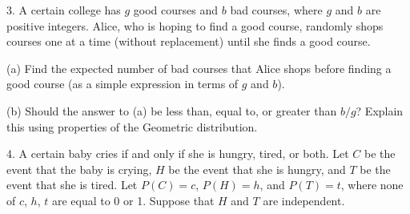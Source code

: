 \documentclass{article}
\begin{document}

\newpage

3. A certain college has $g$ good courses and $b$ bad courses, where $g$ and $b$ are positive integers.  Alice, who is hoping to find a good course, randomly shops courses one at a time (without replacement) until she finds a good course.

(a) Find  the  expected  number  of  bad  courses  that  Alice  shops  before  finding  a  good course (as a simple expression in terms of $g$ and $b$).


(b) Should the answer to (a) be less than, equal to, or greater than $b/g$?  Explain this using properties of the Geometric distribution.


\newpage

4. A certain baby cries if and only if she is hungry, tired, or both.  Let $C$ be the event that the baby is crying, $H$ be the event that she is hungry, and $T$ be the event that she is tired.  Let $P(C) =c$, $P(H) =h$, and $P(T) =t$, where none of $c$, $h$, $t$ are equal to 0 or 1.  Suppose that $H$ and $T$ are independent.
\end{document}
